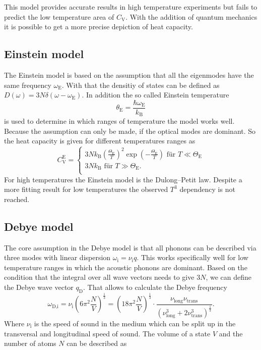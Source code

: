 This model provides accurate results in high temperature experiments but fails to predict the low temperature area of $C_\text{V}$.
With the addition of quantum mechanics it is possible to get a more precise depiction of heat capacity.

\subsection{Einstein model}
\label{ssec:theory3}

The Einstein model is based on the assumption that all the eigenmodes have the same frequency $\omega_\text{E}$.
With that the densitiy of states can be defined as $D (\omega) = 3 N \delta (\omega - \omega_\text{E})$.
In addition the so called Einstein temperature 
\begin{equation}
    \theta_\text{E} = \frac{\hbar \omega_\text{E}}{k_\text{B}}
    \label{eq:einstein}
\end{equation}
is used to determine in which ranges of temperature the model works well.
Because the assumption can only be made, if the optical modes are dominant.
So the heat capacity is given for different temperatures ranges as
\begin{equation}
    C_\text{V}^\text{E} =
      \begin{cases}
        3 N k_\text{B} \left( \frac{\Theta_\text{E}}{T}   \right)^2 \exp(- \frac{\Theta_\text{E}}{T}) \,\, \text{für} \,\,  T \ll \Theta_\text{E}\\
        3 N k_\text{B} \,\, \text{für} \,\, T \gg \Theta_\text{E}.\\
        \end{cases}       
\end{equation}
For high temperatures the Einstein model is the Dulong–Petit law.
Despite a more fitting result for low temperatures the observed $T^3$ dependency is not reached.

\subsection{Debye model}
\label{ssec:theory4}

The core assumption in the Debye model is that all phonons can be described via three modes with linear dispersion $\omega_\text{i} = \nu_\text{i} q$.
This works specifically well for low temperature ranges in which the acoustic phonons are dominant.
Based on the condition that the integral over all wave vectors needs to give $3N$, we can define the Debye wave vector $q_\text{D}$.
That allows to calculate the Debye frequency
\begin{equation}
    \omega_\text{D,i} = \nu_\text{i} \left(6 \pi^2 \frac{N}{V} \right)^{\frac{1}{3}} = \left(18 \pi^2 \frac{N}{V} \right)^{\frac{1}{3}} \cdot \frac{\nu_\text{long} \nu_\text{trans}}{\left( \nu_\text{long}^3 +  2 \nu_\text{trans}^3  \right)^{\frac{1}{3}}}.
    \label{eq:debye_freq}
\end{equation}
Where $\nu_\text{i}$ is the speed of sound in the medium which can be split up in the transversal and longitudinal speed of sound.
The volume of a state $V$ and the number of atoms $N$ can be described as

